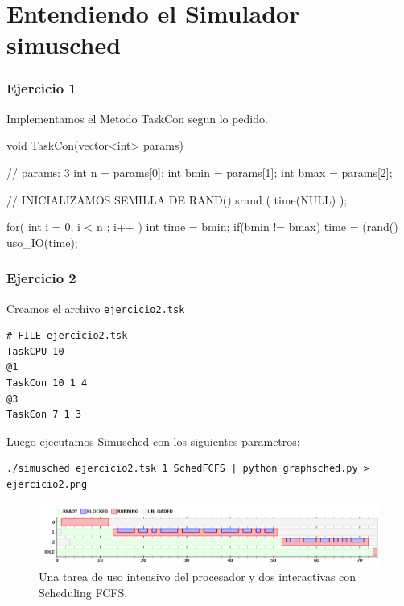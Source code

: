 


\part{Entendiendo el Simulador simusched}

\section{Ejercicio 1}

Implementamos el Metodo TaskCon segun lo pedido.

\begin{framed}
\begin{verbatimtab}
void TaskCon(vector<int> params) { // params: 3
	int n = params[0];
	int bmin = params[1];
	int bmax = params[2];
	
	// INICIALIZAMOS SEMILLA DE RAND()
	srand ( time(NULL) );
	
	for( int i = 0; i < n ; i++ ) {
		int time = bmin;
		if(bmin != bmax)
			time = (rand()%
		uso_IO(time);
	}
}
\end{verbatimtab}
\end{framed}

\section{Ejercicio 2}

Creamos el archivo \verb|ejercicio2.tsk|

\begin{framed}
\begin{verbatim}
# FILE ejercicio2.tsk
TaskCPU 10
@1
TaskCon 10 1 4
@3
TaskCon 7 1 3
\end{verbatim}
\end{framed}


Luego ejecutamos Simusched con los siguientes parametros:

\begin{framed}
\begin{verbatim}
./simusched ejercicio2.tsk 1 SchedFCFS | python graphsched.py > ejercicio2.png
\end{verbatim}
\end{framed}

\begin{figure}[h!]
  \caption{Una tarea de uso intensivo del procesador y dos interactivas con Scheduling FCFS.}
  \centering
    \includegraphics[width=1\textwidth]{img/ejercicio2.png}
\end{figure}



